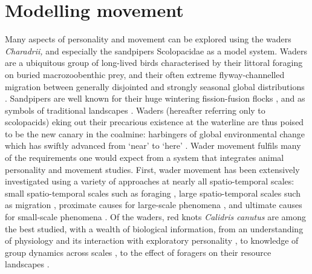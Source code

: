 \section{Modelling movement}

Many aspects of personality and movement can be explored using the
waders \emph{Charadrii,} and especially the sandpipers Scolopacidae as a
model system. Waders are a ubiquitous group of long-lived birds
characterised by their littoral foraging on buried macrozoobenthic prey,
and their often extreme flyway-channelled migration between generally
disjointed and strongly seasonal global distributions
\citep{boere2006a, gill2009, piersma2019}. Sandpipers are well known for
their huge wintering fission-fusion flocks
\citep{myers1983, conklin2008}, and as symbols of traditional landscapes
\citep{colwell2018}. Waders (hereafter referring only to scolopacids)
eking out their precarious existence at the waterline are thus poised to
be the new canary in the coalmine: harbingers of global environmental
change \citep{piersma2004, wikelski2016, fitzpatrick2018} which has
swiftly advanced from `near' to `here' \citep{ipcc2018}. Wader movement
fulfils many of the requirements one would expect from a system that
integrates animal personality and movement studies. First, wader
movement has been extensively investigated using a variety of approaches
at nearly all spatio-temporal scales: small spatio-temporal scales such
as foraging \citep{vangils2003, vangils2010}, large spatio-temporal
scales such as migration \citep{buehler2006, piersma2011}, proximate
causes for large-scale phenomena
\citep{lank2003, ydenberg2004, ruthrauff2013, ruthrauff2018}, and
ultimate causes for small-scale phenomena
\citep{vangils2006, kraan2009}. Of the waders, red knots \emph{Calidris
canutus} are among the best studied, with a wealth of biological
information, from an understanding of physiology and its interaction
with exploratory personality \citep{bijleveld2014, mathot2017}, to
knowledge of group dynamics across scales
\citep{bijleveld2010, bijleveld2012a, bijleveld2015a}, to the effect of
foragers on their resource landscapes \citep{bijleveld2015}.

